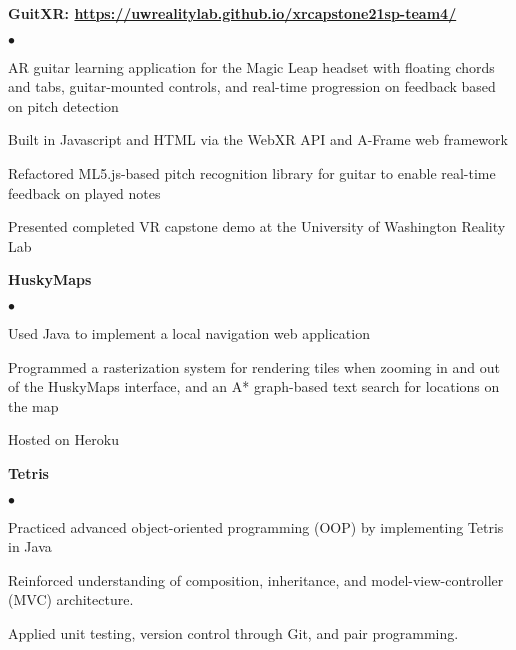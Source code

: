 \documentclass[margin,line]{res}
\newenvironment{list2}{
  \begin{list}{$\bullet$}{%
      \setlength{\itemsep}{0in}
      \setlength{\parsep}{0in} \setlength{\parskip}{0in}
      \setlength{\topsep}{0in} \setlength{\partopsep}{0in} 
      \setlength{\leftmargin}{0.2in}}}{\end{list}}
\begin{document}
\begin{resume}

{\bf GuitXR: \url{https://uwrealitylab.github.io/xrcapstone21sp-team4/}} %
\begin{list2}
\item AR guitar learning application for the Magic Leap headset with floating chords and tabs, guitar-mounted controls, and real-time progression on feedback based on pitch detection
\item Built in Javascript and HTML via the WebXR API and A-Frame web framework
\item Refactored ML5.js-based pitch recognition library for guitar to enable real-time feedback on played notes
\item Presented completed VR capstone demo at the University of Washington Reality Lab
\end{list2}

{\bf HuskyMaps} %
\begin{list2}
	\item Used Java to implement a local navigation web application
	\item Programmed a rasterization system for rendering tiles when zooming in and out of the HuskyMaps interface, and an A* graph-based text search for locations on the map
	\item Hosted on Heroku
\end{list2}

{\bf Tetris} %
\begin{list2}
\item Practiced advanced object-oriented programming (OOP) by implementing Tetris in Java
\item Reinforced understanding of composition, inheritance, and model-view-controller (MVC) architecture. 
\item Applied unit testing, version control through Git, and pair programming.
\end{list2}



\end{resume}
\end{document}
